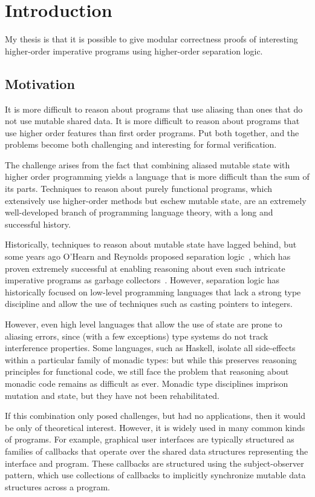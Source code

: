 \chapter{Introduction}

My thesis is that it is possible to give modular correctness proofs of
interesting higher-order imperative programs using higher-order
separation logic.

\section{Motivation}

It is more difficult to reason about programs that use aliasing than
ones that do not use mutable shared data. It is more difficult to
reason about programs that use higher order features than first order
programs. Put both together, and the problems become both challenging
and interesting for formal verification.

The challenge arises from the fact that combining aliased mutable
state with higher order programming yields a language that is more
difficult than the sum of its parts. Techniques to reason about purely
functional programs, which extensively use higher-order methods but
eschew mutable state, are an extremely well-developed branch of
programming language theory, with a long and successful history.

Historically, techniques to reason about mutable state have lagged
behind, but some years ago O'Hearn and Reynolds proposed separation
logic~\citep{sep-logic}, which has proven extremely successful at
enabling reasoning about even such intricate imperative programs as
garbage collectors~\citep{gc-proof}. However, separation logic has
historically focused on low-level programming languages that lack a
strong type discipline and allow the use of techniques such as casting
pointers to integers.

However, even high level languages that allow the use of state are
prone to aliasing errors, since (with a few exceptions) type systems
do not track interference properties. Some languages, such as Haskell,
isolate all side-effects within a particular family of monadic types:
but while this preserves reasoning principles for functional code, we
still face the problem that reasoning about monadic code remains as
difficult as ever. Monadic type disciplines imprison mutation and
state, but they have not been rehabilitated.

If this combination only posed challenges, but had no applications,
then it would be only of theoretical interest. However, it is widely
used in many common kinds of programs. For example, graphical user
interfaces are typically structured as families of callbacks that
operate over the shared data structures representing the interface and
program. These callbacks are structured using the subject-observer
pattern, which use collections of callbacks to implicitly synchronize
mutable data structures across a program.

